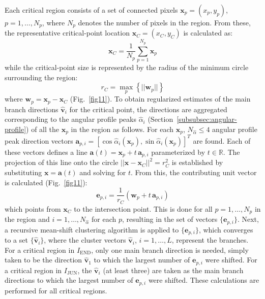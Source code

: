 Each critical region consists of a set of connected pixels $\mathbf{x}_p=(x_p,y_p)$, $p=1,\dots,N_p$, where $N_p$ denotes the number of pixels in the region. From these, the representative critical-point location $\mathbf{x}_C=(x_C,y_C)$ is calculated as:
\begin{equation}
\mathbf{x}_C=\frac{1}{N_p}\sum_{p=1}^{N_p}\mathbf{x}_p
\end{equation}
while the critical-point size is represented by the radius of the minimum circle surrounding the region:
\begin{equation}
r_C = \max_{p}\left\{||\mathbf{w}_p||\right\}
\end{equation}
where $\mathbf{w}_p=\mathbf{x}_p-\mathbf{x}_C$ (Fig.~\ref{fig11}). To obtain regularized estimates of the main branch directions $\hat{\mathbf{v}}_i$ for the critical point, the directions are aggregated corresponding to the angular profile peaks $\hat{\alpha}_i$ (Section~\ref{subsubsec:angular-profile}) of all the $\mathbf{x}_p$ in the region as follows. For each $\mathbf{x}_p$, $N_{\hat{\alpha}}\leq4$ angular profile peak direction vectors $\mathbf{a}_{p,i}=[\cos\hat{\alpha}_i(\mathbf{x}_p),\sin\hat{\alpha}_i(\mathbf{x}_p)]^T$ are found. Each of these vectors defines a line $\mathbf{a}(t)=\mathbf{x}_{p}+t\,\mathbf{a}_{p,i}$ parameterized by $t\in\mathbb{R}$. The projection of this line onto the circle $||\mathbf{x}-\mathbf{x}_C||^2=r^2_C$ is established by substituting $\mathbf{x}=\mathbf{a}(t)$ and solving for $t$. From this, the contributing unit vector is calculated (Fig.~\ref{fig11}):
\begin{equation}
\mathbf{e}_{p,i}=\frac{1}{r_C}(\mathbf{w}_{p}+t\,\mathbf{a}_{p,i})
\end{equation}
which points from $\mathbf{x}_C$ to the intersection point. This is done for all $p=1,\dots,N_p$ in the region and $i=1,\dots,N_{\hat{\alpha}}$ for each $p$, resulting in the set of vectors $\{\mathbf{e}_{p,i}\}$. Next, a recursive mean-shift clustering algorithm \cite{cheng1995mean} is applied to $\{\mathbf{e}_{p,i}\}$, which converges to a set $\{\hat{\mathbf{v}}_{i}\}$, where the cluster vectors $\hat{\mathbf{v}}_{i}$, $i=1,\dots,L$, represent the branches. For a critical region in $I_{\textrm{END}}$, only one main branch direction is needed, simply taken to be the direction $\hat{\mathbf{v}}_1$ to which the largest number of $\mathbf{e}_{p,i}$ were shifted. For a critical region in $I_{\textrm{JUN}}$, the $\hat{\mathbf{v}}_i$ (at least three) are taken as the main branch directions to which the largest number of $\mathbf{e}_{p,i}$ were shifted. These calculations are performed for all critical regions.

